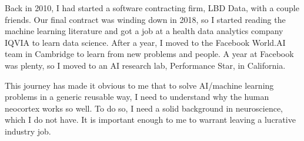 \documentclass{article}
\begin{document}
Back in 2010, I had started a software contracting firm, LBD Data,
with a couple friends. Our final contract was winding down in 2018, so
I started reading the machine learning literature and got a job at a health data analytics company IQVIA to learn data science.  
After a year, I moved to the Facebook World.AI team in Cambridge to learn from new problems and people. 
A year at Facebook was plenty, so I moved to an AI research lab, Performance Star, in California. 

This journey has made it obvious to me that to solve AI/machine learning problems in a generic reusable way, I need to understand why the human neocortex works so well. 
To do so, I need a solid background in neuroscience, which I do not have.  It is important enough to me to warrant leaving a lucrative industry job.
\end{document}
